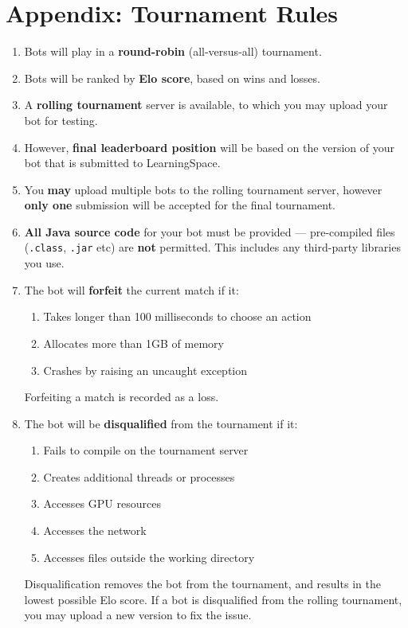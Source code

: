 \documentclass{../../fal_assignment}
\begin{document}
\section*{Appendix: Tournament Rules}

\begin{enumerate}
	\item Bots will play in a \textbf{round-robin} (all-versus-all) tournament.
	\item Bots will be ranked by \textbf{Elo score}, based on wins and losses.
	\item A \textbf{rolling tournament} server is available, to which you may upload your bot for testing.
	\item However, \textbf{final leaderboard position} will be based on the version of your bot that is submitted to LearningSpace.
	\item You \textbf{may} upload multiple bots to the rolling tournament server,
		however \textbf{only one} submission will be accepted for the final tournament.
	\item \textbf{All Java source code} for your bot must be provided ---
		pre-compiled files (\texttt{.class}, \texttt{.jar} etc) are \textbf{not} permitted.
		This includes any third-party libraries you use.
	\item The bot will \textbf{forfeit} the current match if it:
		\begin{enumerate}
			\item Takes longer than 100 milliseconds to choose an action
			\item Allocates more than 1GB of memory
			\item Crashes by raising an uncaught exception
		\end{enumerate}
		Forfeiting a match is recorded as a loss.
	\item The bot will be \textbf{disqualified} from the tournament if it:
		\begin{enumerate}
			\item Fails to compile on the tournament server
			\item Creates additional threads or processes
			\item Accesses GPU resources
			\item Accesses the network
			\item Accesses files outside the working directory
		\end{enumerate}
		Disqualification removes the bot from the tournament, and results in the lowest possible Elo score.
		If a bot is disqualified from the rolling tournament, you may upload a new version to fix the issue.

\end{enumerate}
\end{document}
